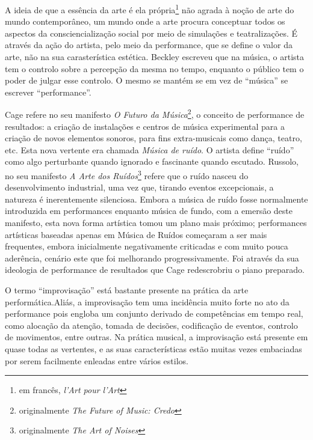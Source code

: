 \documentclass[../main.tex]{subfiles}
\begin{document}
A ideia de que a essência da arte é ela própria\footnote{em francês, \textsl{l'Art pour l'Art}} não agrada à noção de arte do mundo contemporâneo\cite{battcock}, um mundo onde a arte procura conceptuar todos os aspectos da consciencialização social por meio de simulações e teatralizações\cite{carlson1996}. É através da ação do artista, pelo meio da performance, que se define o valor da arte, não na sua carasterística estética\cite{nickas}. Beckley escreveu que na música, o artista tem o controlo sobre a percepção da mesma no tempo, enquanto o público tem o poder de julgar esse controlo\cite{beckley}. O mesmo se mantém se em vez de \enquote{música} se escrever \enquote{performance}\cite{nickas}.

Cage refere no seu manifesto \textsl{O Futuro da Música}\footnote{originalmente \textsl{The Future of Music: Credo}}, o conceito de performance de resultados: a criação de instalações e centros de música experimental para a criação de novos elementos sonoros, para fins extra-musicais como dança, teatro, etc\cite{cage1961}. Esta nova vertente era chamada \textsl{Música de ruído}. O artista define \enquote{ruído} como algo perturbante quando ignorado e fascinante quando escutado. Russolo, no seu manifesto \textsl{A Arte dos Ruídos}\footnote{originalmente \textsl{The Art of Noises}} refere que o ruído nasceu do desenvolvimento industrial, uma vez que, tirando eventos excepcionais, a natureza é inerentemente silenciosa\cite{russolo}. Embora a música de ruído fosse normalmente introduzida em performances enquanto música de fundo, com a emersão deste manifesto, esta nova forma artística tomou um plano mais próximo\cite{goldberg}; performances artísticas baseadas apenas em Música de Ruídos começaram a ser mais frequentes, embora inicialmente negativamente criticadas e com muito pouca aderência, cenário este que foi melhorando progressivamente\cite{russolo,goldberg}. Foi através da sua ideologia de performance de resultados que Cage redescrobriu o piano preparado.

O termo \enquote{improvisação} está bastante presente na prática da arte performática\cite{howell1999,goldberg}.Aliás, a improvisação tem uma incidência muito forte no ato da performance pois engloba um conjunto derivado de competências em tempo real, como alocação da atenção, tomada de decisões, codificação de eventos, controlo de movimentos, entre outras\cite{gabrielsson}. Na prática musical, a improvisação está presente em quase todas as vertentes, e as suas características estão muitas vezes embaciadas por serem facilmente enleadas entre vários estilos\cite{derek}. 
\end{document}
